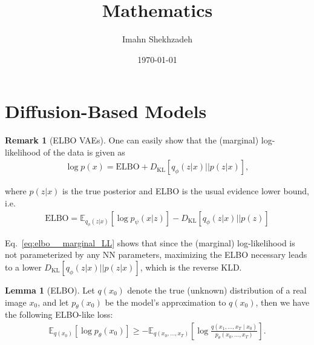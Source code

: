 \documentclass[12pt, a4paper]{article}
\title{Mathematics}
\author{Imahn Shekhzadeh}
\date{\today}
\numberwithin{equation}{section}
\theoremstyle{definition}
\theoremstyle{definition}
\newtheorem{lemma}[thm]{Lemma} %
\newtheorem{remark}[thm]{Remark} %
\begin{document}
	\maketitle
	\tableofcontents

	\newpage
	
	
	\newpage
	
	
	\newpage 
	
	
	\newpage 
	
	
	\newpage
	
			
	\newpage 
		
	
	\newpage 
	
	
	\newpage 
	
	
	\newpage 
	

	\newpage 
	
	\section{Diffusion-Based Models}
		
		\begin{remark}[ELBO VAEs]
			One can easily show that the (marginal) log-likelihood of the data is given as
			\cite{cs_231n_lec_13}
			\begin{align}\label{eq:elbo__marginal_LL}
				\log p(x) = \text{ELBO} + D_{\text{KL}}\left[ q_{\phi}(z\vert x) \vert\vert p(z\vert x)\right], 
			\end{align}
			
			\noindent where $p(z\vert x)$ is the true posterior and ELBO is the usual evidence lower bound, i.e.
			\begin{align}
				\text{ELBO} = \mathbb E_{q_{\phi}(z\vert x)}\left[ \log p_{\psi}(x\vert z) \right] - D_{\text{KL}}\left[ q_{\phi}(z\vert x) \vert\vert p(z) \right]
			\end{align}
			
			\noindent Eq.~\eqref{eq:elbo__marginal_LL} shows that since the (marginal) log-likelihood is not parameterized by any NN parameters, maximizing the ELBO necessary leads to a lower $D_{\text{KL}}\left[ q_{\phi}(z\vert x) \vert\vert p(z\vert x)\right]$, which is the reverse KLD. 
			
		\end{remark}
	
	\begin{lemma}[ELBO]
		Let $q(x_{0})$ denote the true (unknown) distribution of a real image $x_{0}$, and let $p_{\theta}(x_{0})$ be the model's approximation to $q(x_{0})$, then we have the following ELBO-like loss: 
		\begin{align}\label{elbo_diffusion_models}
			\mathbb E_{q(x_{0})}\left[\log p_{\theta}(x_{0})\right] \geq -\mathbb E_{q(x_{0}, \dots, x_{T})}\left[\log \frac{q(x_{1}, \dots, x_{T} \mid x_{0})}{p_{\theta}(x_{0}, \dots, x_{T})}\right].    
		\end{align}
	\end{lemma}
	
\end{document}
